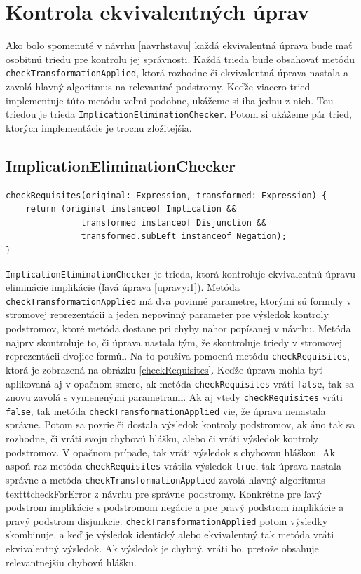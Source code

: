 \section{Kontrola ekvivalentných úprav}

Ako bolo spomenuté v návrhu \eqref{navrhstavu} každá ekvivalentná úprava bude mať osobitnú triedu pre kontrolu jej správnosti. Každá trieda bude obsahovať metódu \texttt{checkTransfo\-rmationApplied}, ktorá rozhodne či ekvivalentná úprava nastala a zavolá hlavný algoritmus na relevantné podstromy. Keďže viacero tried implementuje túto metódu veľmi podobne, ukážeme si iba jednu z nich. Tou triedou je trieda \texttt{ImplicationElimination\-Checker}. Potom si ukážeme pár tried, ktorých implementácie je trochu zložitejšia.

\subsection{ImplicationEliminationChecker}

\begin{lstlisting}[float,caption={Kontrola tried dátového modelu},label=checkRequisites,basicstyle=\small]
checkRequisites(original: Expression, transformed: Expression) {
    return (original instanceof Implication &&
               transformed instanceof Disjunction &&
               transformed.subLeft instanceof Negation);
}
\end{lstlisting}

\texttt{ImplicationEliminationChecker} je trieda, ktorá kontroluje ekvivalentnú úpravu eliminácie implikácie (ľavá úprava \eqref{upravy:1}). Metóda \texttt{checkTransformationApplied} má dva povinné parametre, ktorými sú formuly v stromovej reprezentácii a jeden nepovinný parameter pre výsledok kontroly podstromov, ktoré metóda dostane pri  chyby nahor popísanej v návrhu. Metóda najprv skontroluje to, či úprava nastala tým, že skontroluje triedy v stromovej reprezentácii dvojice formúl. Na to používa pomocnú metódu \texttt{checkRequisites}, ktorá je zobrazená na obrázku \eqref{checkRequisites}. Keďže úprava mohla byť aplikovaná aj v opačnom smere, ak metóda \texttt{checkRequisites} vráti \texttt{false}, tak sa  znovu zavolá s vymenenými parametrami. Ak aj vtedy \texttt{checkRequisites} vráti \texttt{false}, tak metóda \texttt{checkTransformationApplied} vie, že úprava nenastala správne. Potom sa pozrie či dostala výsledok kontroly podstromov, ak áno tak sa rozhodne, či vráti svoju chybovú hlášku, alebo či vráti výsledok kontroly podstromov. V opačnom prípade, tak vráti výsledok s chybovou hláškou. Ak aspoň raz metóda \texttt{checkRequisites} vrátila výsledok \texttt{true}, tak úprava nastala správne a metóda \texttt{checkTransformationApplied} zavolá hlavný algoritmus texttt{checkForError} z návrhu pre správne podstromy. Konkrétne pre ľavý podstrom implikácie s podstromom negácie a pre pravý podstrom implikácie a pravý podstrom disjunkcie. \texttt{checkTransformationApplied} potom výsledky skombinuje, a keď je výsledok identický alebo ekvivalentný tak metóda vráti ekvivalentný výsledok. Ak výsledok je chybný, vráti ho, pretože obsahuje relevantnejšiu chybovú hlášku.


